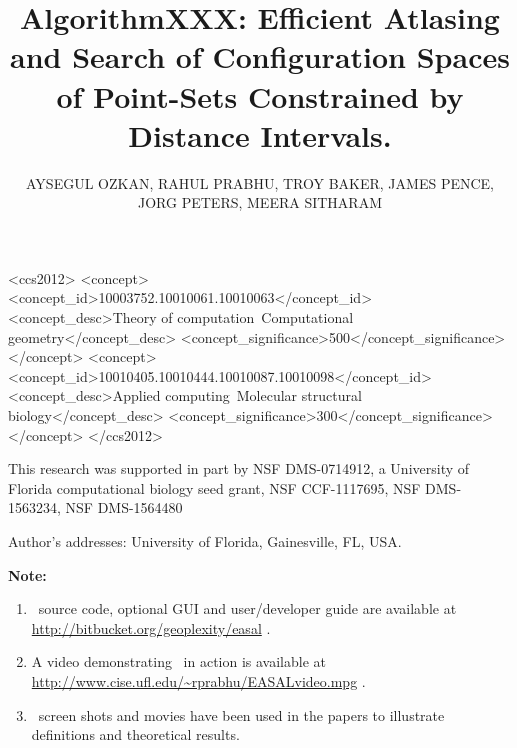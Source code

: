 \documentclass[promode,acmtoms]{acmsmall}
\begin{document}

 

\begin{CCSXML}
<ccs2012>
<concept>
<concept_id>10003752.10010061.10010063</concept_id>
<concept_desc>Theory of computation~Computational geometry</concept_desc>
<concept_significance>500</concept_significance>
</concept>
<concept>
<concept_id>10010405.10010444.10010087.10010098</concept_id>
<concept_desc>Applied computing~Molecular structural biology</concept_desc>
<concept_significance>300</concept_significance>
</concept>
</ccs2012>
\end{CCSXML}


 
\title{AlgorithmXXX: Efficient Atlasing and Search of Configuration Spaces of Point-Sets Constrained by Distance Intervals.}
\author{AYSEGUL OZKAN, RAHUL PRABHU, TROY BAKER, JAMES PENCE, JORG PETERS, MEERA SITHARAM
}


\begin{bottomstuff}
This research was supported in part by NSF DMS-0714912, a University of Florida computational
biology seed grant,   NSF CCF-1117695, NSF DMS-1563234, NSF DMS-1564480

Author's addresses: University of Florida, Gainesville, FL, USA.

\textbf{Note:}
\begin{enumerate}
		\item \EASAL~source code, optional GUI and user/developer guide are available at
				\url{http://bitbucket.org/geoplexity/easal} \cite{easalSoftware}.
		\item A video demonstrating \EASAL~in action is available at
				\url{http://www.cise.ufl.edu/~rprabhu/EASALvideo.mpg} \cite{easalVideo}.
		\item \EASAL~screen shots and movies have been used in the papers
				\cite{sym8010005,Ozkan2011,Wu2012,Ozkan2014MainEasal,Ozkan2014MC,Ozkan2014Jacobian,Wu2014Virus}
				to illustrate definitions and theoretical results.
\end{enumerate}
\end{bottomstuff}
\end{document}
